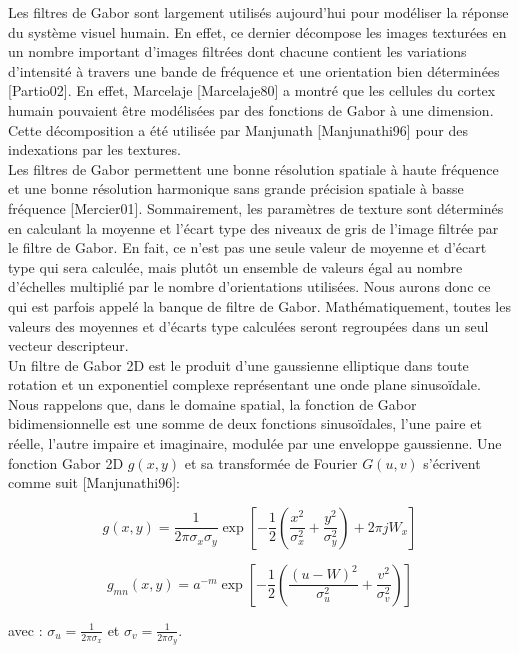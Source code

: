 Les filtres de Gabor sont largement utilisés aujourd’hui pour modéliser la réponse du système visuel humain. En effet, ce dernier décompose les images texturées en un nombre important d'images filtrées dont chacune contient les variations d'intensité à travers une bande de fréquence et une orientation bien déterminées [Partio02]. En effet, Marcelaje [Marcelaje80] a montré que les cellules du cortex humain pouvaient être modélisées par des fonctions de Gabor à une dimension. Cette décomposition a été utilisée par Manjunath [Manjunathi96] pour des indexations par les textures.\\

Les filtres de Gabor permettent une bonne résolution spatiale à haute fréquence et une bonne résolution harmonique sans grande précision spatiale à basse fréquence [Mercier01]. Sommairement, les paramètres de texture sont déterminés en calculant la moyenne et l’écart type des niveaux de gris de l’image filtrée par le filtre de Gabor. En fait, ce n’est pas une seule valeur de moyenne et d’écart type qui sera calculée, mais plutôt un ensemble de valeurs égal au nombre d’échelles multiplié par le nombre d’orientations utilisées. Nous aurons donc ce qui est parfois appelé la banque de filtre de Gabor. Mathématiquement, toutes les valeurs des moyennes et d’écarts type calculées seront regroupées dans un seul vecteur descripteur. \\

Un filtre de Gabor 2D est le produit d'une gaussienne elliptique dans toute rotation et un exponentiel complexe représentant une onde plane sinusoïdale. Nous rappelons que, dans le domaine spatial, la fonction de Gabor bidimensionnelle est une somme de deux fonctions sinusoïdales, l'une paire et réelle, l'autre impaire et imaginaire, modulée par une enveloppe gaussienne. Une fonction Gabor 2D $g(x, y)$ et sa transformée de Fourier $G(u, v)$ s'écrivent comme suit [Manjunathi96]:

\begin{equation}
	g(x, y) = \frac{1}{2\pi \sigma_x \sigma_y} \exp\left[-\frac{1}{2} (\frac{x^2}{\sigma_x^2} + \frac{y^2}{\sigma_y^2}) + 2\pi j W_x\right]
\end{equation}

\begin{equation}
	g_{mn}(x, y) = a^{-m} \exp\left[-\frac{1}{2} (\frac{(u-W)^2}{\sigma_u^2} + \frac{v^2}{\sigma_v^2})\right] 
\end{equation}

 avec : $\sigma_u = \frac{1}{2\pi \sigma_x } $ et  $ \sigma_v = \frac{1}{2\pi  \sigma_y} $. \\
 
